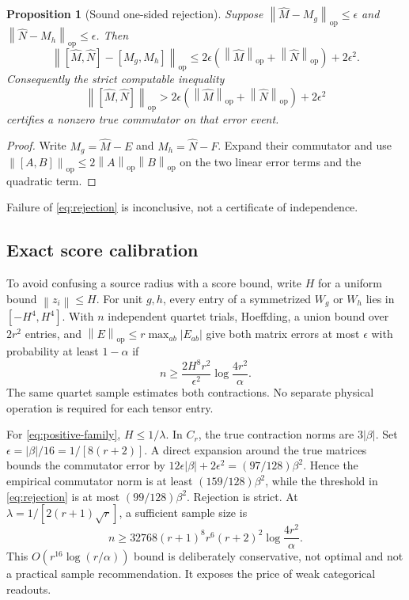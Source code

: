 \documentclass[11pt]{article}
\newtheorem{proposition}[theorem]{Proposition}
\theoremstyle{definition}
\theoremstyle{remark}
\newcommand{\op}{\mathrm{op}}
\newcommand{\norm}[1]{\left\lVert#1\right\rVert}
\begin{document}
\begin{proposition}[Sound one-sided rejection]
\label{prop:noise}
Suppose $\norm{\widehat M-M_g}_{\op}\le\epsilon$ and
$\norm{\widehat N-M_h}_{\op}\le\epsilon$. Then
\begin{equation}
\norm{[\widehat M,\widehat N]-[M_g,M_h]}_{\op}
\le2\epsilon(\norm{\widehat M}_{\op}+\norm{\widehat N}_{\op})
+2\epsilon^2.
\label{eq:commutator-bound}
\end{equation}
Consequently the strict computable inequality
\begin{equation}
\norm{[\widehat M,\widehat N]}_{\op}
>2\epsilon(\norm{\widehat M}_{\op}+\norm{\widehat N}_{\op})
+2\epsilon^2
\label{eq:rejection}
\end{equation}
certifies a nonzero true commutator on that error event.
\end{proposition}
\begin{proof}
Write $M_g=\widehat M-E$ and $M_h=\widehat N-F$. Expand their commutator
and use $\norm{[A,B]}_{\op}\le2\norm A_{\op}\norm B_{\op}$ on the two
linear error terms and the quadratic term.
\end{proof}
Failure of \eqref{eq:rejection} is inconclusive, not a certificate of
independence.

\subsection{Exact score calibration}

To avoid confusing a source radius with a score bound, write $H$ for a
uniform bound $\norm{z_i}\le H$. For unit $g,h$, every entry of a
symmetrized $W_g$ or $W_h$ lies in $[-H^4,H^4]$. With $n$ independent
quartet trials, Hoeffding, a union bound over $2r^2$ entries, and
$\norm E_{\op}\le r\max_{ab}|E_{ab}|$ give both matrix errors at most
$\epsilon$ with probability at least $1-\alpha$ if
\begin{equation}
n\ge\frac{2H^8r^2}{\epsilon^2}\log\frac{4r^2}{\alpha}.
\label{eq:commutator-hoeffding}
\end{equation}
The same quartet sample estimates both contractions. No separate
physical operation is required for each tensor entry.

For \eqref{eq:positive-family}, $H\le1/\lambda$. In $C_r$, the true
contraction norms are $3|\beta|$. Set
$\epsilon=|\beta|/16=1/[8(r+2)]$. A direct expansion around the true
matrices bounds the commutator error by
$12\epsilon|\beta|+2\epsilon^2=(97/128)\beta^2$. Hence the empirical
commutator norm is at least $(159/128)\beta^2$, while the threshold in
\eqref{eq:rejection} is at most $(99/128)\beta^2$. Rejection is strict.
At $\lambda=1/[2(r+1)\sqrt r]$, a sufficient sample size is
\begin{equation}
n\ge32768(r+1)^8r^6(r+2)^2\log\frac{4r^2}{\alpha}.
\label{eq:commutator-sample-large}
\end{equation}
This $O(r^{16}\log(r/\alpha))$ bound is deliberately conservative, not
optimal and not a practical sample recommendation. It exposes the price
of weak categorical readouts.
\end{document}
